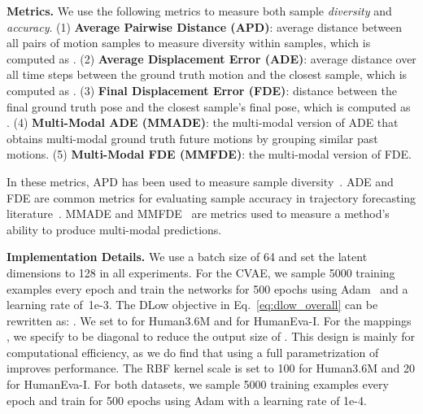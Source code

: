 \documentclass[runningheads]{llncs}
\begin{document}
	\vspace{2mm}
	\noindent\textbf{Metrics.} We use the following metrics to measure both sample \emph{diversity} and \emph{accuracy}. (1) \textbf{Average Pairwise Distance (APD)}: average  distance between all pairs of motion samples to measure diversity within samples, which is computed as . (2) \textbf{Average Displacement Error (ADE)}: average  distance over all time steps between the ground truth motion  and the closest sample, which is computed as . (3) \textbf{Final Displacement Error (FDE)}:  distance between the final ground truth pose  and the closest sample's final pose, which is computed as . (4) \textbf{Multi-Modal ADE (MMADE)}: the multi-modal version of ADE that obtains multi-modal ground truth future motions by grouping similar past motions. (5) \textbf{Multi-Modal FDE (MMFDE)}: the multi-modal version of FDE.
	
	In these metrics, APD has been used to measure sample diversity~\cite{aliakbarian2020stochastic}. ADE and FDE are common metrics for evaluating sample accuracy in trajectory forecasting literature~\cite{alahi2016social,lee2017desire,gupta2018social}. MMADE and MMFDE~\cite{yuan2019diverse} are metrics used to measure a method's ability to produce multi-modal predictions.
	
	\vspace{1mm}
	\noindent\textbf{Implementation Details.} We use a batch size of 64 and set the latent dimensions  to 128 in all experiments. For the CVAE, we sample 5000 training examples every epoch and train the networks for 500 epochs using Adam~\cite{kingma2014adam} and a learning rate of~\mbox{1e-3}. The DLow objective in Eq.~\eqref{eq:dlow_overall} can be rewritten as: . We set  to  for Human3.6M and  for HumanEva-I. For the mappings , we specify  to be diagonal to reduce the output size of . This design is mainly for computational efficiency, as we do find that using a full parametrization of  improves performance. The RBF kernel scale  is set to 100 for Human3.6M and 20 for HumanEva-I. For both datasets, we sample 5000 training examples every epoch and train  for 500 epochs using Adam with a learning rate of 1e-4.
	
\end{document}
